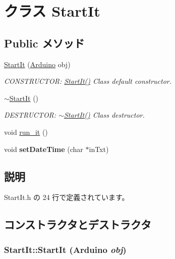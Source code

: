 \hypertarget{classStartIt}{
\section{クラス StartIt}
\label{classStartIt}
}
\subsection*{Public メソッド}
\begin{DoxyCompactItemize}
\item 
\hyperlink{classStartIt_ae7c8fafd44aa73f2f535845e2f98ea86_ae7c8fafd44aa73f2f535845e2f98ea86}{StartIt} (\hyperlink{classArduino}{Arduino} obj)
\begin{DoxyCompactList}\small\item\em CONSTRUCTOR: \hyperlink{classStartIt_ae7c8fafd44aa73f2f535845e2f98ea86_ae7c8fafd44aa73f2f535845e2f98ea86}{StartIt()} Class default constructor. \item\end{DoxyCompactList}\item 
\hyperlink{classStartIt_a023b9d2f8412eda996a638d0e3c4c39c_a023b9d2f8412eda996a638d0e3c4c39c}{$\sim$StartIt} ()
\begin{DoxyCompactList}\small\item\em DESTRUCTOR: \hyperlink{classStartIt_a023b9d2f8412eda996a638d0e3c4c39c_a023b9d2f8412eda996a638d0e3c4c39c}{$\sim$StartIt()} Class destructor. \item\end{DoxyCompactList}\item 
void \hyperlink{classStartIt_a8a1a2a8f7b8f05e248baa8958bb93967_a8a1a2a8f7b8f05e248baa8958bb93967}{run\_\-it} ()
\item 
\hypertarget{classStartIt_a8779324ca3561eeb51103a914eaf0af5_a8779324ca3561eeb51103a914eaf0af5}{
void {\bfseries setDateTime} (char $\ast$inTxt)}
\label{classStartIt_a8779324ca3561eeb51103a914eaf0af5_a8779324ca3561eeb51103a914eaf0af5}

\end{DoxyCompactItemize}


\subsection{説明}


 StartIt.h の 24 行で定義されています。

\subsection{コンストラクタとデストラクタ}
\hypertarget{classStartIt_ae7c8fafd44aa73f2f535845e2f98ea86_ae7c8fafd44aa73f2f535845e2f98ea86}{
\subsubsection[{StartIt}]{\setlength{\rightskip}{0pt plus 5cm}StartIt::StartIt ({\bf Arduino} {\em obj})}}
\label{classStartIt_ae7c8fafd44aa73f2f535845e2f98ea86_ae7c8fafd44aa73f2f535845e2f98ea86}


